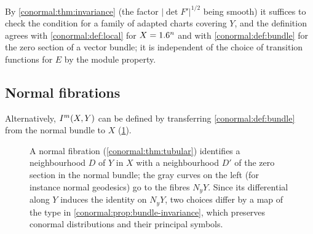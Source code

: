 By \cref{conormal:thm:invariance} (the factor $|\det F'|^{1/2}$ being smooth)
it suffices to check the condition for a family of adapted charts covering $Y$,
and the definition agrees with \cref{conormal:def:local} for $X=1.6^n$ and with
\cref{conormal:def:bundle} for the zero section of a vector bundle; it is
independent of the choice of transition functions for $E$ by the module
property.

\subsection{Normal fibrations}
Alternatively, $I^{m}(X,Y)$ can be defined by transferring
\cref{conormal:def:bundle} from the normal bundle to $X$
(\cref{conormal:fig:tubular}).

\begin{figure}[htbp]
\centering
{}
\caption[A normal fibration]{A normal fibration
(\cref{conormal:thm:tubular}) identifies a neighbourhood $D$ of $Y$ in $X$
with a neighbourhood $D'$ of the zero section in the normal bundle; the
gray curves on the left (for instance normal geodesics) go to the fibres
$N_yY$. Since its differential along $Y$ induces the identity on $N_yY$, two
choices differ by a map of the type in
\cref{conormal:prop:bundle-invariance}, which preserves conormal
distributions and their principal symbols.}
\label{conormal:fig:tubular}
\end{figure}


